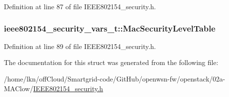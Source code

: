 Definition at line 87 of file I\+E\+E\+E802154\+\_\+security.\+h.

\subsubsection[{\texorpdfstring{Mac\+Security\+Level\+Table}{MacSecurityLevelTable}}]{ ieee802154\+\_\+security\+\_\+vars\+\_\+t\+::\+Mac\+Security\+Level\+Table}\hypertarget{structieee802154__security__vars__t_ad5ce651d0ae075cb6551bf9f56c93937}{}\label{structieee802154__security__vars__t_ad5ce651d0ae075cb6551bf9f56c93937}


Definition at line 89 of file I\+E\+E\+E802154\+\_\+security.\+h.



The documentation for this struct was generated from the following file\+:\begin{DoxyCompactItemize}
\item 
/home/lkn/off\+Cloud/\+Smartgrid-\/code/\+Git\+Hub/openwsn-\/fw/openstack/02a-\/\+M\+A\+Clow/\hyperlink{_i_e_e_e802154__security_8h}{I\+E\+E\+E802154\+\_\+security.\+h}\end{DoxyCompactItemize}
